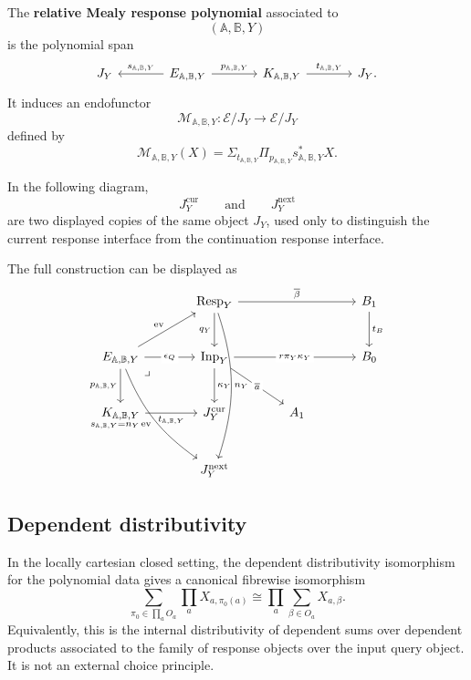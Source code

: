 \begin{definition}
\label{def:poly-relative-mealy-response-polynomial}
The \textbf{relative Mealy response polynomial} associated to
\[
(\mathbb A,\mathbb B,Y)
\]
is the polynomial span
\[
\begin{tikzcd}[column sep=large]
J_Y
&
E_{\mathbb A,\mathbb B,Y}
  \arrow[l,"s_{\mathbb A,\mathbb B,Y}"']
  \arrow[r,"p_{\mathbb A,\mathbb B,Y}"]
&
K_{\mathbb A,\mathbb B,Y}
  \arrow[r,"t_{\mathbb A,\mathbb B,Y}"]
&
J_Y.
\end{tikzcd}
\]
It induces an endofunctor
\[
\mathcal M_{\mathbb A,\mathbb B,Y}:
\mathcal E/J_Y\to\mathcal E/J_Y
\]
defined by
\[
\mathcal M_{\mathbb A,\mathbb B,Y}(X)
=
\Sigma_{t_{\mathbb A,\mathbb B,Y}}
\Pi_{p_{\mathbb A,\mathbb B,Y}}
s_{\mathbb A,\mathbb B,Y}^{\ast}X.
\]
\end{definition}

In the following diagram,
\[
J_Y^{\mathrm{cur}}
\qquad\text{and}\qquad
J_Y^{\mathrm{next}}
\]
are two displayed copies of the same object \(J_Y\), used only to distinguish
the current response interface from the continuation response interface.

The full construction can be displayed as
\[
\begin{tikzcd}[column sep=large,row sep=large]
&
\mathrm{Resp}_Y
  \arrow[rr,"\overline\beta"]
  \arrow[d,"q_Y"']
  \arrow[ddd,bend left=18,"n_Y"]
&&
B_1
  \arrow[d,"t_B"]
\\
E_{\mathbb A,\mathbb B,Y}
  \arrow[ur,"\operatorname{ev}"]
  \arrow[r,"\epsilon_Q" description]
  \arrow[d,"p_{\mathbb A,\mathbb B,Y}"']
  \arrow[ddr,bend right=16,"s_{\mathbb A,\mathbb B,Y}=n_Y\operatorname{ev}"']
  \arrow[dr,phantom,very near start,"\lrcorner"]
&
\mathrm{Inp}_Y
  \arrow[rr,"r\pi_Y\kappa_Y" description]
  \arrow[d,"\kappa_Y"]
  \arrow[dr,"\overline a" description]
&&
B_0
\\
K_{\mathbb A,\mathbb B,Y}
  \arrow[r,"t_{\mathbb A,\mathbb B,Y}"']
&
J_Y^{\mathrm{cur}}
&
A_1
&
\\
&
J_Y^{\mathrm{next}}
&
&
\end{tikzcd}
\]

\subsection{Dependent distributivity}
\label{subsec:poly-relative-dependent-distributivity}

\begin{lemma}
\label{lem:poly-relative-dependent-distributivity}
In the locally cartesian closed setting, the dependent distributivity
isomorphism for the polynomial data gives a canonical fibrewise isomorphism
\[
\sum_{\pi_0\in\prod_a O_a}
\prod_a X_{a,\pi_0(a)}
\cong
\prod_a
\sum_{\beta\in O_a}X_{a,\beta}.
\]
Equivalently, this is the internal distributivity of dependent sums over
dependent products associated to the family of response objects over the input
query object.  It is not an external choice principle.
\end{lemma}

